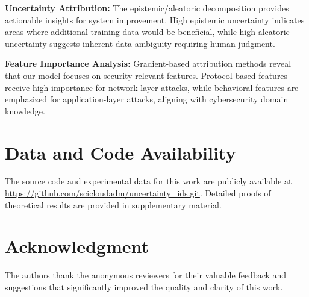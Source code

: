 \documentclass[journal]{IEEEtran}
\begin{document}
\textbf{Uncertainty Attribution:} The epistemic/aleatoric decomposition provides actionable insights for system improvement. High epistemic uncertainty indicates areas where additional training data would be beneficial, while high aleatoric uncertainty suggests inherent data ambiguity requiring human judgment.

\textbf{Feature Importance Analysis:} Gradient-based attribution methods reveal that our model focuses on security-relevant features. Protocol-based features receive high importance for network-layer attacks, while behavioral features are emphasized for application-layer attacks, aligning with cybersecurity domain knowledge.

\section*{Data and Code Availability}

The source code and experimental data for this work are publicly available at \url{https://github.com/scicloudadm/uncertainty_ids.git}. Detailed proofs of theoretical results are provided in supplementary material.

\section*{Acknowledgment}

The authors thank the anonymous reviewers for their valuable feedback and suggestions that significantly improved the quality and clarity of this work.



\end{document}
